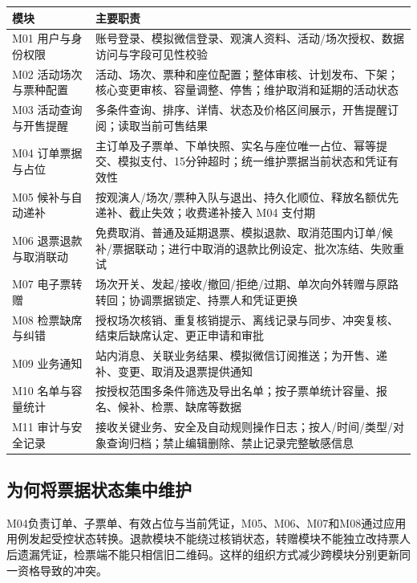 \documentclass[UTF8,zihao=-4,fontset=windows]{ctexart}
\begin{document}
\begin{small}
\noindent\begin{tabularx}{\linewidth}{p{47mm}X}
\toprule
模块 & 主要职责 \\ \midrule
M01 用户与身份权限 & 账号登录、模拟微信登录、观演人资料、活动/场次授权、数据访问与字段可见性校验 \\
M02 活动场次与票种配置 & 活动、场次、票种和座位配置；整体审核、计划发布、下架；核心变更审核、容量调整、停售；维护取消和延期的活动状态 \\
M03 活动查询与开售提醒 & 多条件查询、排序、详情、状态及价格区间展示，开售提醒订阅；读取当前可售结果 \\
M04 订单票据与占位 & 主订单及子票单、下单快照、实名与座位唯一占位、幂等提交、模拟支付、15分钟超时；统一维护票据当前状态和凭证有效性 \\
M05 候补与自动递补 & 按观演人/场次/票种入队与退出、持久化顺位、释放名额优先递补、截止失效；收费递补接入 M04 支付期 \\
M06 退票退款与取消联动 & 免费取消、普通及延期退票、模拟退款、取消范围内订单/候补/票据联动；进行中取消的退款比例设定、批次冻结、失败重试 \\
M07 电子票转赠 & 场次开关、发起/接收/撤回/拒绝/过期、单次向外转赠与原路转回；协调票据锁定、持票人和凭证更换 \\
M08 检票缺席与纠错 & 授权场次核销、重复核销提示、离线记录与同步、冲突复核、结束后缺席认定、更正申请和审批 \\
M09 业务通知 & 站内消息、关联业务结果、模拟微信订阅推送；为开售、递补、变更、取消及退票提供通知 \\
M10 名单与容量统计 & 按授权范围多条件筛选及导出名单；按子票单统计容量、报名、候补、检票、缺席等数据 \\
M11 审计与安全记录 & 接收关键业务、安全及自动规则操作日志；按人/时间/类型/对象查询归档；禁止编辑删除、禁止记录完整敏感信息 \\
\bottomrule
\end{tabularx}
\end{small}\par\smallskip

\subsection{为何将票据状态集中维护}
M04负责订单、子票单、有效占位与当前凭证，M05、M06、M07和M08通过应用用例发起受控状态转换。退款模块不能绕过核销状态，转赠模块不能独立改持票人后遗漏凭证，检票端不能只相信旧二维码。这样的组织方式减少跨模块分别更新同一资格导致的冲突。
\end{document}
